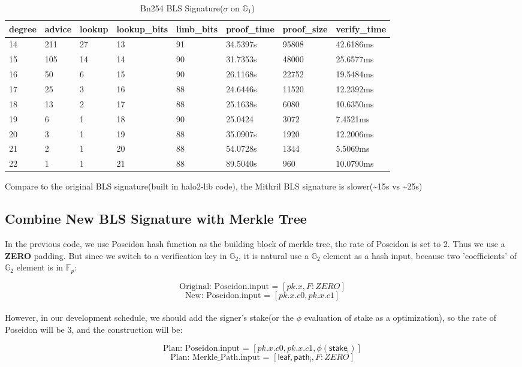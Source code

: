 \documentclass{article}
\begin{document}
\begin{table}[H]
    \centering
    \begin{tabular}{p{1cm}|p{1cm}|p{1cm}|p{2cm}|p{1.5cm}|p{1.5cm}|p{1.5cm}|p{1.5cm}} \hline
          degree&advice&lookup&lookup\_bits&limb\_bits&proof\_time&proof\_size&verify\_time \\ \hline
14&	211&27&		13&	91&		34.5397s&	95808&	42.6186ms\\ \hline
15&	105&14&		14&	90&		31.7353s&	48000&	25.6577ms\\ \hline
16&	50&	6&		15&	90&		26.1168s&	22752&	19.5484ms\\ \hline
17&	25&	3&		16&	88&		24.6446s&	11520&	12.2392ms\\ \hline
18&	13&	2&		17&	88&		25.1638s&	6080&	10.6350ms\\ \hline
19&	6&	1&		18&	90&		25.0424&	3072&	7.4521ms\\ \hline
20&	3&	1&		19&	88&		35.0907s&	1920&	12.2006ms\\ \hline
21&	2&	1&  	20&	88&		54.0728s&	1344&	5.5069ms\\ \hline
22&	1&	1&		21&	88&		89.5040s&	960&	10.0790ms\\ \hline
      
    \end{tabular}
    \caption{Bn254 BLS Signature($\sigma$ on $\mathbb{G}_1$)}
    \label{tab:my_label}
\end{table}

Compare to the original BLS signature(built in halo2-lib code), the Mithril BLS signature is slower(\textasciitilde15s vs \textasciitilde25s)


\subsection{Combine New BLS Signature with Merkle Tree}

In the previous code, we use Poseidon hash function as the building block of merkle tree, the rate of Poseidon is set to 2.
Thus we use a \textbf{ZERO} padding. But since we switch to a verification key in $\mathbb{G}_2$, it is natural use a $\mathbb{G}_2$ element as a hash input, because two 'coefficients' of $\mathbb{G}_2$ element is in  $\mathbb{F}_p$:

\[
\textrm{Original: Poseidon.input = $[pk.x, F:ZERO]$}
\]
\[
\textrm{New: Poseidon.input = $[pk.x.c0, pk.x.c1]$}
\]
\\


However, in our development schedule, we should add the signer's stake(or the $\phi$ evaluation of stake as a optimization), so the rate of Poseidon will be 3, and the construction will be:

\[
\textrm{Plan: Poseidon.input = $[pk.x.c0, pk.x.c1, \phi(\mathsf{stake_i})]$}
\]
\[
\textrm{Plan: Merkle\_Path.input = $[\mathsf{leaf}, \mathsf{path_i}, F:ZERO]$}
\]
\\
\end{document}
